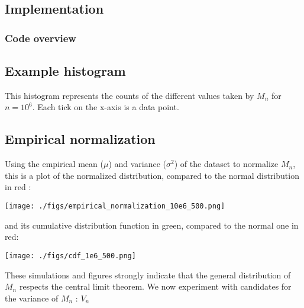 \subsection{ Implementation }

	\subsubsection{ Code overview }
 
 \subsection{Example histogram}
 This histogram represents the counts of the different 
 values taken by $M_n$ for $n=10^6$. 
 Each tick on the x-axis is a data point.
 

	\subsection{Empirical normalization}
\begin{minipage}{\textwidth-7cm}
	Using the empirical mean ($\mu$) and variance ($\sigma^2$) of the dataset to normalize $M_n$,
	this is a plot of the normalized distribution, compared to the normal distribution 
	in red :
\end{minipage}
  \begin{minipage}[m]{7cm}
        \texttt{[image: ./figs/empirical\_normalization\_10e6\_500.png]}	
	\end{minipage} 

	\noindent
	 and its cumulative distribution function in green, compared to the normal one in red:
 	
 	 \begin{minipage}[t]{7cm}
        \texttt{[image: ./figs/cdf\_1e6\_500.png]}
	\end{minipage} 
	
	
	These simulations and figures strongly indicate that the general distribution
	of $M_n$ respects the central limit theorem. We now experiment with
	candidates for the variance of $M_n$ : $V_n$

